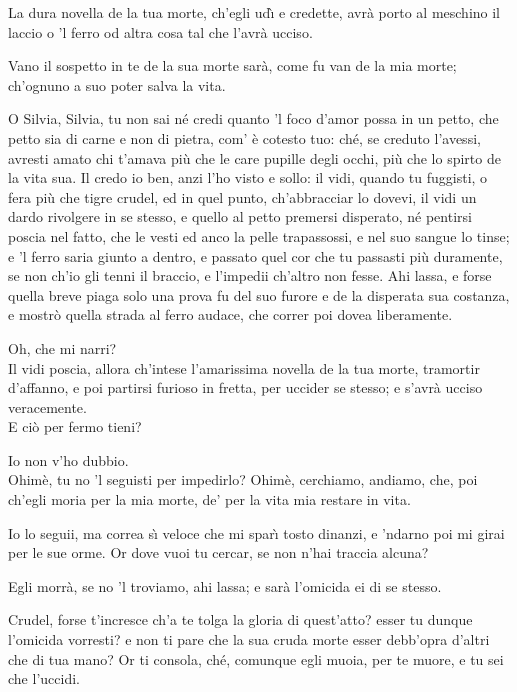 \documentclass{book}
\begin{document}
   \2 La dura novella
	de la tua morte, ch'egli ud\`{\i} e credette,
	avr\`a porto al meschino il laccio o 'l ferro
	od altra cosa tal che l'avr\`a ucciso.

	\3 Vano il sospetto in te de la sua morte
	sar\`a, come fu van de la mia morte;
	ch'ognuno a suo poter salva la vita.

	\2 O Silvia, Silvia, tu non sai n\'e credi
	quanto 'l foco d'amor possa in un petto,
	che petto sia di carne e non di pietra,
	com' \`e cotesto tuo: ch\'e, se creduto
	l'avessi, avresti amato chi t'amava
	pi\`u che le care pupille degli occhi,
	pi\`u che lo spirto de la vita sua.
	Il credo io ben, anzi l'ho visto e sollo:
	il vidi, quando tu fuggisti, o fera
	pi\`u che tigre crudel, ed in quel punto,
	ch'abbracciar lo dovevi, il vidi un dardo
	rivolgere in se stesso, e quello al petto
	premersi disperato, n\'e pentirsi
	poscia nel fatto, che le vesti ed anco
	la pelle trapassossi, e nel suo sangue
	lo tinse; e 'l ferro saria giunto a dentro,
	e passato quel cor che tu passasti
	pi\`u duramente, se non ch'io gli tenni
	il braccio, e l'impedii ch'altro non fesse.
	Ahi lassa, e forse quella breve piaga
	solo una prova fu del suo furore
	e de la disperata sua costanza,
	e mostr\`o quella strada al ferro audace,
	che correr poi dovea liberamente.

	\3 Oh, che mi narri? \\

   \2 Il vidi poscia, allora
	ch'intese l'amarissima novella
	de la tua morte, tramortir d'affanno,
	e poi partirsi furioso in fretta,
	per uccider se stesso; e s'avr\`a ucciso
	veracemente. \\

   \3 E ci\`o per fermo tieni?

	\2 Io non v'ho dubbio. \\

   \3 Ohim\`e, tu no 'l seguisti
	per impedirlo? Ohim\`e, cerchiamo, andiamo,
	che, poi ch'egli moria per la mia morte,
	de' per la vita mia restare in vita.

	\2 Io lo seguii, ma correa s\`{\i} veloce
	che mi spar\`{\i} tosto dinanzi, e 'ndarno
	poi mi girai per le sue orme. Or dove
	vuoi tu cercar, se non n'hai traccia alcuna?

	\3 Egli morr\`a, se no 'l troviamo, ahi lassa;
	e sar\`a l'omicida ei di se stesso.

	\2 Crudel, forse t'incresce ch'a te tolga
	la gloria di quest'atto? esser tu dunque
	l'omicida vorresti? e non ti pare
	che la sua cruda morte esser debb'opra
	d'altri che di tua mano? Or ti consola,
	ch\'e, comunque egli muoia, per te muore,
	e tu sei che l'uccidi.
\end{document}
